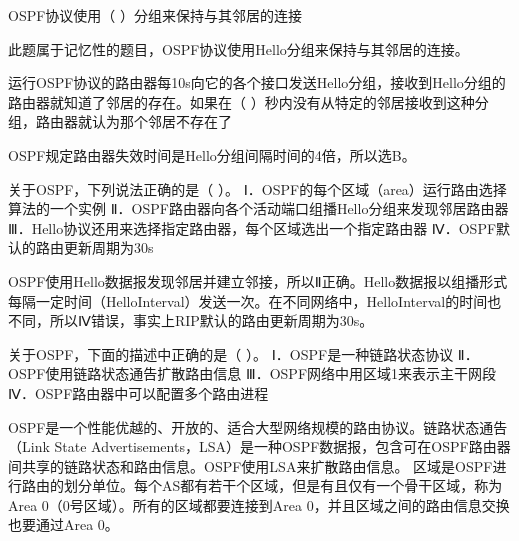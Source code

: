 \question OSPF协议使用（ ）分组来保持与其邻居的连接
\par{}
\begin{solution}此题属于记忆性的题目，OSPF协议使用Hello分组来保持与其邻居的连接。
\end{solution}
\question 运行OSPF协议的路由器每10s向它的各个接口发送Hello分组，接收到Hello分组的路由器就知道了邻居的存在。如果在（
）秒内没有从特定的邻居接收到这种分组，路由器就认为那个邻居不存在了
\par{}
\begin{solution}OSPF规定路由器失效时间是Hello分组间隔时间的4倍，所以选B。
\end{solution}
\question 关于OSPF，下列说法正确的是（ ）。
Ⅰ．OSPF的每个区域（area）运行路由选择算法的一个实例
Ⅱ．OSPF路由器向各个活动端口组播Hello分组来发现邻居路由器
Ⅲ．Hello协议还用来选择指定路由器，每个区域选出一个指定路由器
Ⅳ．OSPF默认的路由更新周期为30s
\par{}
\begin{solution}OSPF使用Hello数据报发现邻居并建立邻接，所以Ⅱ正确。Hello数据报以组播形式每隔一定时间（HelloInterval）发送一次。在不同网络中，HelloInterval的时间也不同，所以Ⅳ错误，事实上RIP默认的路由更新周期为30s。
\end{solution}
\question 关于OSPF，下面的描述中正确的是（ ）。 Ⅰ．OSPF是一种链路状态协议
Ⅱ．OSPF使用链路状态通告扩散路由信息 Ⅲ．OSPF网络中用区域1来表示主干网段
Ⅳ．OSPF路由器中可以配置多个路由进程
\par{}
\begin{solution}OSPF是一个性能优越的、开放的、适合大型网络规模的路由协议。链路状态通告（Link
State
Advertisements，LSA）是一种OSPF数据报，包含可在OSPF路由器间共享的链路状态和路由信息。OSPF使用LSA来扩散路由信息。
区域是OSPF进行路由的划分单位。每个AS都有若干个区域，但是有且仅有一个骨干区域，称为Area
0（0号区域）。所有的区域都要连接到Area
0，并且区域之间的路由信息交换也要通过Area 0。
\end{solution}
